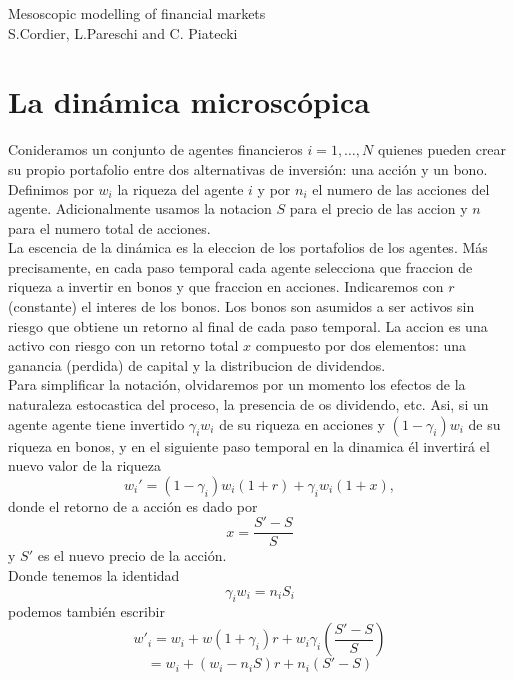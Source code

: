 \documentclass[12pt]{article}
\begin{document}
\begin{center}
Mesoscopic modelling of financial markets\\
\small{S.Cordier, L.Pareschi and C. Piatecki}
\end{center}
\section*{La dinámica microscópica}
\quad Conideramos un conjunto de agentes financieros $i=1,\dots,N$ quienes pueden crear su propio portafolio entre dos alternativas de inversión: una acción y un bono. Definimos por $w_i$ la riqueza del agente $i$ y por $n_i$ el numero de las acciones del agente. Adicionalmente usamos la notacion $S$ para el precio de las accion y $n$ para el numero total de acciones.\\
\quad La escencia de la dinámica es la eleccion de los portafolios de los agentes. Más precisamente, en cada paso temporal cada agente selecciona que fraccion de riqueza a invertir en bonos y que fraccion en acciones. Indicaremos con $r$ (constante) el interes de los bonos. Los bonos son asumidos a ser activos sin riesgo que obtiene un retorno al final de cada paso temporal. La accion es una activo con riesgo con un retorno total $x$ compuesto por dos elementos: una ganancia (perdida) de capital y la distribucion de dividendos.\\
\quad Para simplificar la notación, olvidaremos por un momento los efectos de la naturaleza estocastica del proceso, la presencia de os dividendo, etc. Asi, si un agente agente tiene invertido $\gamma_i w_i$ de su riqueza en acciones y $(1-\gamma_i)w_i$ de su riqueza en bonos, y en el siguiente paso temporal en la dinamica él invertirá el nuevo valor de la riqueza
\begin{equation}
w_{i}'= (1-\gamma_i)w_i(1+r)+\gamma_i w_i (1+x),\label{ec1}
\end{equation}
donde el retorno de a acción es dado por 
\begin{equation}
x =\frac{S'-S}{S}
\end{equation}
y $S'$ es el nuevo precio de la acción.\\
\quad Donde tenemos la identidad
\begin{equation}
\gamma_i w_i=n_iS_i
\end{equation}
podemos también escribir
\begin{equation}
w'_i=w_i+w(1+\gamma_i)r+ w_i\gamma_i\left(\frac{S'-S}{S}\right)
\end{equation}
\begin{equation}
= w_i+(w_i-n_iS)r+n_i(S'-S)
\end{equation}
\end{document}

